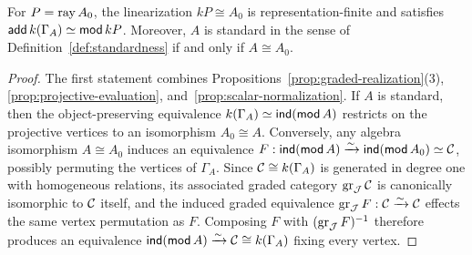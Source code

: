 \begin{corollary}
\label{cor:graded-standard-form}
For $P=\operatorname{ray} A_0$, the linearization $kP\cong A_0$ is representation-finite
and satisfies $\operatorname{\mathsf{add}} k(\Gamma_A)\simeq\operatorname{\mathsf{mod}} kP$. Moreover, $A$ is standard in
the sense of Definition~\ref{def:standardness} if and only if $A\cong A_0$.
\end{corollary}
\begin{proof}
The first statement combines Propositions~\ref{prop:graded-realization}(3),
\ref{prop:projective-evaluation}, and~\ref{prop:scalar-normalization}. If $A$
is standard, then the object-preserving equivalence
$k(\Gamma_A)\simeq\operatorname{\mathsf{ind}}(\operatorname{\mathsf{mod}} A)$ restricts on the projective vertices to an
isomorphism $A_0\cong A$. Conversely, any algebra isomorphism $A\cong A_0$
induces an equivalence $F:\operatorname{\mathsf{ind}}(\operatorname{\mathsf{mod}} A)\xrightarrow{\sim}\operatorname{\mathsf{ind}}(\operatorname{\mathsf{mod}} A_0)\simeq\mathcal C$,
possibly permuting the vertices of $\Gamma_A$. Since $\mathcal C\cong k(\Gamma_A)$ is
generated in degree one with homogeneous relations, its associated graded
category $\operatorname{gr}_\mathcal J\mathcal C$ is canonically isomorphic to $\mathcal C$ itself, and the induced
graded equivalence $\operatorname{gr}_\mathcal J F:\mathcal C\xrightarrow{\sim}\mathcal C$ effects the same vertex
permutation as $F$. Composing $F$ with $(\operatorname{gr}_\mathcal J F)^{-1}$ therefore produces an
equivalence $\operatorname{\mathsf{ind}}(\operatorname{\mathsf{mod}} A)\xrightarrow{\sim}\mathcal C\cong k(\Gamma_A)$ fixing every
vertex.
\end{proof}
